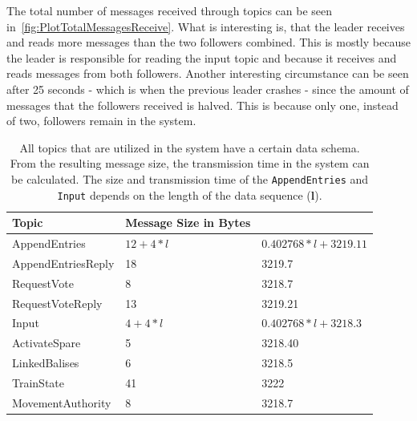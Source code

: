 The total number of messages received through  topics can be seen in~\autoref{fig:PlotTotalMessagesReceive}.
What is interesting is, that the leader receives and reads more messages than the two followers combined.
This is mostly because the leader is responsible for reading the input topic and because it receives and reads messages from both followers.
Another interesting circumstance can be seen after 25 seconds - which is when the previous leader crashes - since the amount of messages that the followers received is halved.
This is because only one, instead of two, followers remain in the system.



\begin{table}[h!]
	\begin{center}
		\caption{All topics that are utilized in the system have a certain data schema. From the resulting message size, the transmission time in the system can be calculated. The size and transmission time of the \texttt{AppendEntries} and \texttt{Input} depends on the length of the data sequence (\textbf{l}).}
		\label{tab:topicSendingTimes}
		\begin{tabularx}{\textwidth}{|X|X|}
			\hline
			\textbf{Topic} & \textbf{Message Size in Bytes} \\
			\hline \hline
			AppendEntries & $12 + 4 * l$ & $0.402768 * l + 3219.11$ \\
			\hline
			AppendEntriesReply & 18 & 3219.7 \\
			\hline
			RequestVote & 8 & 3218.7 \\
			\hline
			RequestVoteReply & 13 & 3219.21 \\
			\hline
			Input & $4 + 4 * l$ & $0.402768 * l + 3218.3$ \\
			\hline
			ActivateSpare & 5 & 3218.40 \\
			\hline
			LinkedBalises & 6 & 3218.5 \\
			\hline
			TrainState & 41 & 3222 \\
			\hline
			MovementAuthority & 8 & 3218.7 \\
			\hline
		\end{tabularx}
	\end{center}
\end{table}



